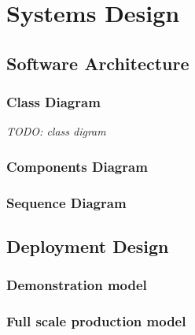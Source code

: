 %
%
\chapter{Systems Design}

\section{Software Architecture}

\subsection{Class Diagram}

\textit{TODO: class digram}

\subsection{Components Diagram}

\subsection{Sequence Diagram}

\section{Deployment Design}

\subsection{Demonstration model}

\subsection{Full scale production model}

\clearpage